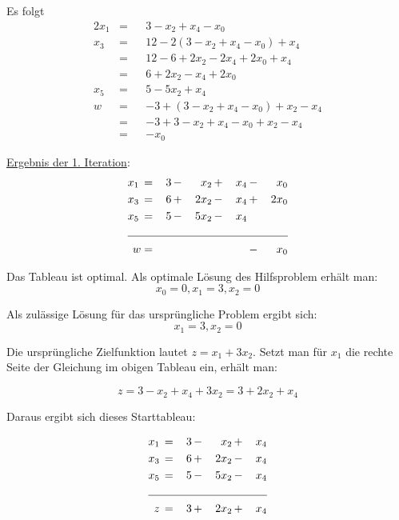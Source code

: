 \documentclass[10pt,a4paper,oneside,ngerman,numbers=noenddot]{scrartcl}
\begin{document}
		Es folgt
		\begin{alignat*}{2}
			x_{1} &=&& 3 - x_{2} + x_{4} - x_{0} \\
			x_{3} &=&& 12 - 2\left(3 - x_{2} + x_{4} - x_{0}\right) + x_{4} \\
			&=&& 12 - 6 + 2x_{2} - 2x_{4} + 2x_{0} + x_{4} \\
			&=&& 6 + 2x_{2} - x_{4} + 2x_{0} \\
			x_{5} &=&& 5 - 5x_{2} + x_{4} \\
			w &=&& -3 + \left(3 - x_{2} + x_{4} - x_{0}\right) + x_{2} - x_{4} \\
			&=&& -3 + 3 - x_{2} + x_{4} - x_{0} + x_{2} - x_{4} \\
			&=&& - x_{0}
		\end{alignat*}
		
		\underline{Ergebnis der 1. Iteration}:
		\begin{alignat*}{5}
			x_{1} \,&=&\, 3 \,&-&\, x_{2} \,&+&\, x_{4} \,&-&\, x_{0}  \\
			x_{3} \,&=&\, 6 \,&+&\, 2x_{2} \,&-&\, x_{4} \,&+&\, 2x_{0} \\
			x_{5} \,&=&\, 5 \,&-&\, 5x_{2} \,&-&\, x_{4} \,&& \\ \cline{1 - 9}
			w &=& && && &-& x_{0} 
		\end{alignat*}
		
		Das Tableau ist optimal. Als optimale Lösung des Hilfsproblem erhält man:
		\[
			x_{0} =0, x_{1} = 3, x_{2} = 0
		\]
		
		Als zulässige Lösung für das ursprüngliche Problem ergibt sich:
		\[
			x_{1} = 3, x_{2} = 0
		\]
		
		Die ursprüngliche Zielfunktion lautet $z = x_{1} + 3x_{2}$. Setzt man für $x_{1}$ die rechte Seite der Gleichung im obigen Tableau ein, erhält man:
		
		\[
			z = 3 - x_{2} + x_{4} + 3x_{2} = 3 + 2x_{2} + x_{4}
		\]
		
		Daraus ergibt sich dieses Starttableau:
		
		\begin{alignat*}{4}
			x_{1} \,&=&\, 3 \,&-&\, x_{2} \,&+&\, x_{4} \\
			x_{3} \,&=&\, 6 \,&+&\, 2x_{2} \,&-&\, x_{4} \\
			x_{5} \,&=&\, 5 \,&-&\, 5x_{2} \,&-&\, x_{4} \\ \cline{1 - 7}
			z \,&=&\, 3 \,&+&\, 2x_{2} \,&+&\, x_{4}
		\end{alignat*}
		
\end{document}

